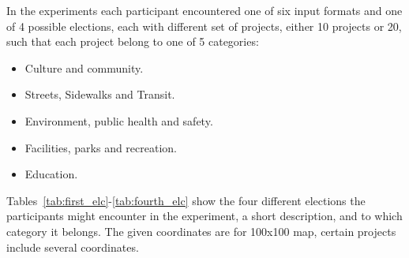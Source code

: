 \documentclass[runningheads]{llncs}
\begin{document}
In the experiments each participant encountered one of six input formats and one of 4 possible elections, each with different set of projects, either 10 projects or 20, such that each project belong to one of 5 categories:

\begin{itemize}
    \item Culture and community.
    \item Streets, Sidewalks and Transit.
    \item Environment, public health and safety.
    \item Facilities, parks and recreation.
    \item Education.
\end{itemize}

Tables~\ref{tab:first_elc}-\ref{tab:fourth_elc} show the four different elections the participants might encounter in the experiment, a short description, and to which category it belongs. The given coordinates are for 100x100 map, certain projects include several coordinates.
\end{document}
